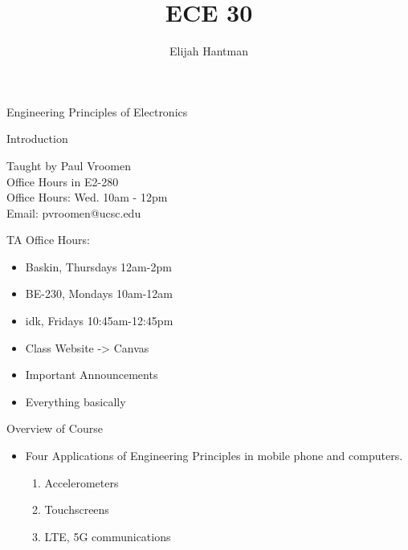 \documentclass{report}
\title{\Huge{ECE 30}}
\author{\huge{Elijah Hantman}}
\date{}
\begin{document}
\maketitle
\newpage

{\huge Engineering Principles of Electronics}

\begin{description}
    \item Introduction 
        \begin{mdframed}
            Taught by Paul Vroomen\\
            Office Hours in E2-280\\
            Office Hours: Wed. 10am - 12pm\\
            Email: pvroomen@ucsc.edu
        \end{mdframed}
        \begin{mdframed}
            TA Office Hours:
            \begin{itemize}
                \item Baskin, Thursdays 12am-2pm
                \item BE-230, Mondays 10am-12am
                \item idk, Fridays 10:45am-12:45pm
            \end{itemize}
        \end{mdframed}
        \begin{mdframed}
            \begin{itemize}
                \item Class Website -> Canvas
                \item Important Announcements
                \item Everything basically
            \end{itemize}
        \end{mdframed}
    \item Overview of Course
        \begin{mdframed}
            \begin{itemize}
                \item Four Applications of Engineering
                    Principles in mobile phone and computers.
                    \begin{enumerate}
                        \item Accelerometers
                        \item Touchscreens
                        \item LTE, 5G communications

\end{enumerate}
\end{itemize}
\end{mdframed}
\end{description}
\end{document}
